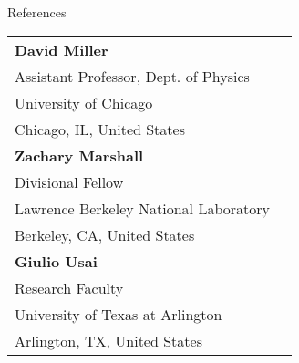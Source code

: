\documentclass{resume}
\begin{document}
\begin{rsection}{References}
  \begin{tabular}{@{}p{8cm}p{8cm}}
    \textbf{David Miller} \\
    Assistant Professor, Dept. of Physics \\
    University of Chicago \\
    Chicago, IL, United States \\[1em]

    \textbf{Zachary Marshall} \\   
    Divisional Fellow \\          
    Lawrence Berkeley National Laboratory \\
    Berkeley, CA, United States \\[1em]          

    \textbf{Giulio Usai} \\
    Research Faculty \\       
    University of Texas at Arlington\\
    Arlington, TX, United States
  \end{tabular}
\end{rsection}
\end{document}
